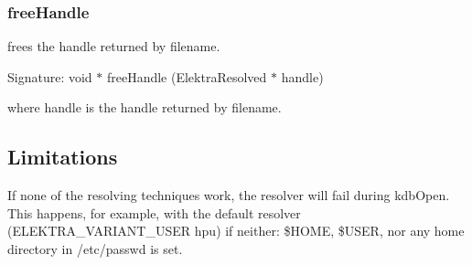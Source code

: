 \subsubsection*{free\+Handle}

frees the handle returned by {\ttfamily filename}.

Signature\+: {\ttfamily void $\ast$ free\+Handle (Elektra\+Resolved $\ast$ handle)}

where {\ttfamily handle} is the handle returned by {\ttfamily filename}.

\subsection*{Limitations}

If none of the resolving techniques work, the resolver will fail during {\ttfamily kdb\+Open}. This happens, for example, with the default resolver (E\+L\+E\+K\+T\+R\+A\+\_\+\+V\+A\+R\+I\+A\+N\+T\+\_\+\+U\+S\+ER {\ttfamily hpu}) if neither\+: {\ttfamily \$\+H\+O\+ME}, {\ttfamily \$\+U\+S\+ER}, nor any home directory in {\ttfamily /etc/passwd} is set. 
